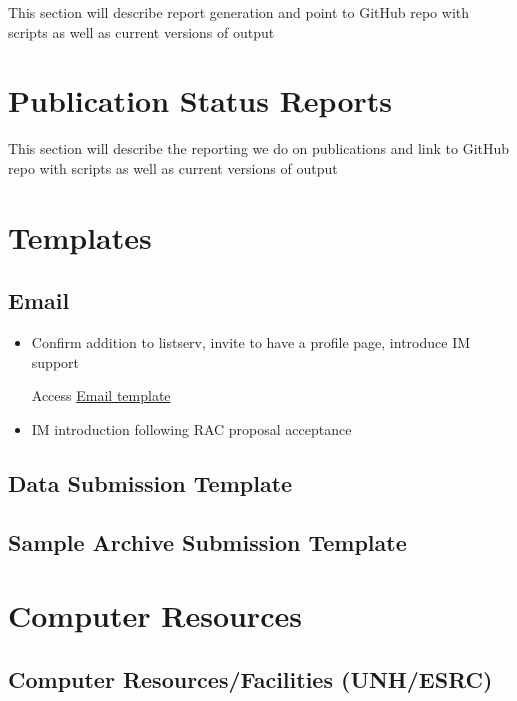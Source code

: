 \documentclass[
  letterpaper,
  DIV=11,
  numbers=noendperiod]{scrreprt}
\begin{document}
This section will describe report generation and point to GitHub repo
with scripts as well as current versions of output


\chapter{Publication Status Reports}\label{publication-status-reports}

This section will describe the reporting we do on publications and link
to GitHub repo with scripts as well as current versions of output


\chapter{Templates}\label{templates}

\section{Email}\label{email}

\begin{itemize}
\item
  Confirm addition to listserv, invite to have a profile page, introduce
  IM support

  Access \href{Email_Welcome2HBR.md}{Email template}
\item
  IM introduction following RAC proposal acceptance
\end{itemize}

\section{Data Submission Template}\label{data-submission-template}

\section{Sample Archive Submission
Template}\label{sample-archive-submission-template}


\chapter{Computer Resources}\label{computer-resources}

\section{Computer Resources/Facilities
(UNH/ESRC)}\label{computer-resourcesfacilities-unhesrc}
\end{document}
